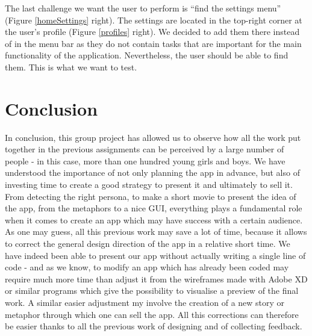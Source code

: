 \documentclass[12pt]{scrartcl}
\begin{document}
		The last challenge we want the user to perform is “find the settings menu” (Figure \ref{homeSettings} right). The settings are located in the top-right corner at the user’s profile (Figure \ref{profiles} right). We decided to add them there instead of in the menu bar as they do not contain tasks that are important for the main functionality of the application. Nevertheless, the user should be able to find them. This is what we want to test.\\
		
		\newpage

			
\section{Conclusion}

	
	In conclusion, this group project has allowed us to observe how all the work put together in the previous assignments can be perceived by a large number of people - in this case, more than one hundred young girls and boys. We have understood the importance of not only planning the app in advance, but also of investing time to create a good strategy to present it and ultimately to sell it. From detecting the right persona, to make a short movie to present the idea of the app, from the metaphors to a nice GUI, everything plays a fundamental role when it comes to create an app which may have success with a certain audience. As one may guess, all this previous work may save a lot of time, because it allows to correct the general design direction of the app in a relative short time. We have indeed been able to present our app without actually writing a single line of code - and as we know, to modify an app which has already been coded may require much more time than adjust it from the wireframes made with Adobe XD or similar programs which give the possibility to visualise a preview of the final work. A similar easier adjustment my involve the creation of a new story or metaphor through which one can sell the app. All this corrections can therefore be easier thanks to all the previous work of designing and of collecting feedback.\\
	
\end{document}
